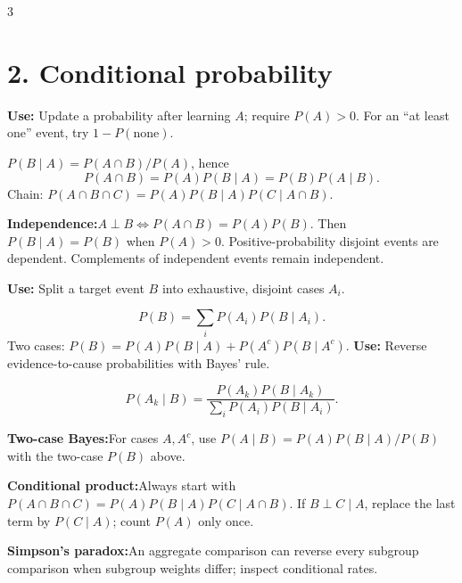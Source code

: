 \documentclass[10pt,a4paper,landscape]{article}
\newcommand{\CheatNote}[2]{\par\noindent\textcolor{cueorange}{\textbf{#1:}}\;#2\par}
\newcommand{\Use}[1]{\textcolor{cueorange}{\textbf{Use:}} #1\par}
\begin{document}
\begin{multicols}{3}
\section*{2. Conditional probability}
\Use{Update a probability after learning \(A\); require \(P(A)>0\). For an ``at least one'' event, try \(1-P(\mathrm{none})\).}
\(P(B\mid A)=P(A\cap B)/P(A)\), hence
\[P(A\cap B)=P(A)P(B\mid A)=P(B)P(A\mid B).\]
Chain: \(P(A\cap B\cap C)=P(A)P(B\mid A)P(C\mid A\cap B)\).
\CheatNote{Independence}{\(A\perp B\iff P(A\cap B)=P(A)P(B)\). Then \(P(B\mid A)=P(B)\) when \(P(A)>0\). Positive-probability disjoint events are dependent. Complements of independent events remain independent.}
\Use{Split a target event \(B\) into exhaustive, disjoint cases \(A_i\).}
\[P(B)=\sum_i P(A_i)P(B\mid A_i).\]
Two cases: \(P(B)=P(A)P(B\mid A)+P(A^c)P(B\mid A^c)\).
\Use{Reverse evidence-to-cause probabilities with Bayes' rule.}
\[P(A_k\mid B)=\frac{P(A_k)P(B\mid A_k)}{\sum_iP(A_i)P(B\mid A_i)}.\]
\CheatNote{Two-case Bayes}{For cases \(A,A^c\), use \(P(A\mid B)=P(A)P(B\mid A)/P(B)\) with the two-case \(P(B)\) above.}
\CheatNote{Conditional product}{Always start with \(P(A\cap B\cap C)=P(A)P(B\mid A)P(C\mid A\cap B)\). If \(B\perp C\mid A\), replace the last term by \(P(C\mid A)\); count \(P(A)\) only once.}
\CheatNote{Simpson's paradox}{An aggregate comparison can reverse every subgroup comparison when subgroup weights differ; inspect conditional rates.}


\end{multicols}
\end{document}
